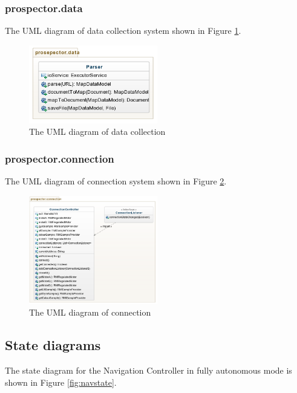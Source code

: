 \documentclass[12pt]{article}
\begin{document}
\subsubsection{prospector.data}
The UML diagram of data collection system shown in Figure \ref{fig:data}.

\begin{figure}[!htb]
\centering\includegraphics[width=0.5\textwidth]{data.png}
\caption{The UML diagram of data collection}
  \label{fig:data}
\end{figure}
\subsubsection{prospector.connection}
The UML diagram of connection system shown in Figure \ref{fig:connection}.

\begin{figure}[!htb]
\centering\includegraphics[width=0.5\textwidth]{connection.png}
\caption{The UML diagram of connection}
  \label{fig:connection}
\end{figure}

\FloatBarrier
\subsection{State diagrams}
The state diagram for the Navigation Controller in fully autonomous mode is shown in Figure \ref{fig:navstate}.
\end{document}
